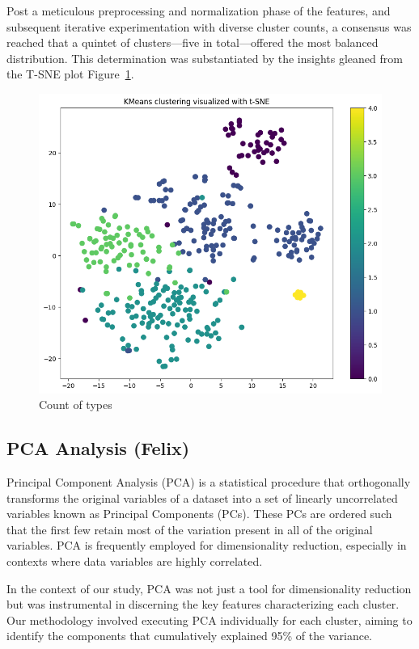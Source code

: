 \documentclass[12pt]{article}
\begin{document}
Post a meticulous preprocessing and normalization phase of the features, and subsequent iterative experimentation with diverse cluster counts, a consensus was reached that a quintet of clusters—five in total—offered the most balanced distribution. This determination was substantiated by the insights gleaned 
from the T-SNE plot Figure~\ref{fig:cluster}.

\begin{figure}[h]
  \centering
  \includegraphics[width=0.7\linewidth]{images/Kmeans_5_clusters}
  \caption{Count of types}
  \label{fig:cluster}
  \end{figure}


\subsection{PCA Analysis (Felix)}

Principal Component Analysis (PCA) is a statistical procedure that orthogonally transforms the original variables of a dataset into a set of linearly uncorrelated variables known as Principal Components (PCs). These PCs are ordered such that the first few retain most of the variation present in all of the original variables. PCA is frequently employed for dimensionality reduction, especially in contexts where data variables are highly correlated.

In the context of our study, PCA was not just a tool for dimensionality reduction but was instrumental in discerning the key features characterizing each cluster. Our methodology involved executing PCA individually for each cluster, aiming to identify the components that cumulatively explained 95\% of the variance.
\end{document}
